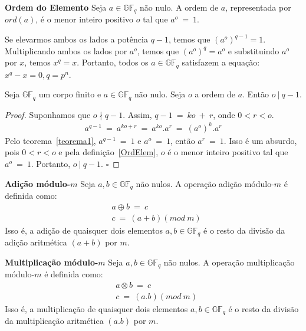 \begin{definition} {\bf Ordem do Elemento} \label{OrdElem}  Seja $a \in \mathbb{GF}_q$ não nulo. A ordem de $a$, representada por $ord(a)$, é o menor inteiro positivo $o$ tal que $a^o\ =\ 1$.
\end{definition}

\begin{property} Se elevarmos ambos os lados a potência $q - 1$, temos que $(a^o)^{q - 1} = 1$. Multiplicando ambos os lados por $a^o$, temos que $(a^o)^q = a^o$ e substituindo $a^o$ por $x$, temos $x^q = x$. Portanto, todos os $a \in \mathbb{GF}_q$ satisfazem a equação: $x^q - x = 0, q = p^n$.
\end{property}

\begin{theorem} \label{teorema2} Seja $\mathbb{GF}_q$ um corpo finito e $a \in \mathbb{GF}_q$ não nulo. Seja $o$ a ordem de $a$. Então $o\ |\ q-1$.
\end{theorem}

\begin{proof} Suponhamos que $o \nmid q-1$. Assim, $q-1\ =\ ko\ +\ r$, onde $0 < r < o$.
$$
\begin{array}{cl}
a^{q-1}\ =\ a^{ko+r}\ =\ a^{ko}.a^r\ =\ (a^o)^k.a^r
\end{array}
$$
Pelo teorema~\ref{teorema1}, $a^{q-1}\ =\ 1$ e $a^o\ =\ 1$, então $a^r\ =\ 1$. Isso é um absurdo, pois $0 < r < o$ e pela definição~\ref{OrdElem}, $o$ é o menor inteiro positivo tal que $a^o\ =\ 1$. Portanto, $o\ |\ q-1$. $\square$
\end{proof}

\begin{definition} {\bf Adição módulo-$m$} \label{AdicaoM}  Seja $a,b  \in \mathbb{GF}_q$ não nulos. A operação adição módulo-$m$ é definida  como:
\begin{align*}
& a \oplus b\ =\ c\\
& c\ =\ (a+b)(mod\ m)
\end{align*}
Isso é, a adição de quaisquer dois elementos $a,b \in \mathbb{GF}_q$ é o resto da divisão da adição aritmética $(a+b)$ por $m$.
\end{definition}

\begin{definition} {\bf Multiplicação módulo-$m$} \label{MultiM}  Seja $a,b  \in \mathbb{GF}_q$ não nulos. A operação multiplicação módulo-$m$ é definida  como:
\begin{align*}
& a \otimes b\ =\ c\\
& c\ =\ (a.b)(mod\ m)
\end{align*}
Isso é, a multiplicação de quaisquer dois elementos $a,b \in \mathbb{GF}_q$ é o resto da divisão da multiplicação aritmética $(a.b)$ por $m$.
\end{definition}

